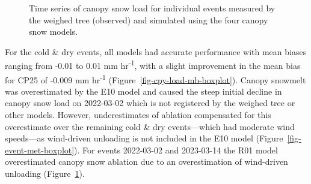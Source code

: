\documentclass[
  letterpaper,
]{tex/uofsthesis-cs}
\begin{document}
\begin{figure}


\caption{\label{fig-obs-mod-w-tree}Time series of canopy snow load for
individual events measured by the weighed tree (observed) and simulated
using the four canopy snow models.}

\end{figure}%

For the cold \& dry events, all models had accurate performance with
mean biases ranging from -0.01 to 0.01 mm hr\textsuperscript{-1}, with a
slight improvement in the mean bias for CP25 of -0.009 mm
hr\textsuperscript{-1} (Figure~\ref{fig-cpy-load-mb-boxplot}). Canopy
snowmelt was overestimated by the E10 model and caused the steep initial
decline in canopy snow load on 2022-03-02 which is not registered by the
weighed tree or other models. However, underestimates of ablation
compensated for this overestimate over the remaining cold \& dry
events---which had moderate wind speeds---as wind-driven unloading is
not included in the E10 model (Figure~\ref{fig-event-met-boxplot}). For
events 2022-03-02 and 2023-03-14 the R01 model overestimated canopy snow
ablation due to an overestimation of wind-driven unloading
(Figure~\ref{fig-obs-mod-w-tree}).
\end{document}
